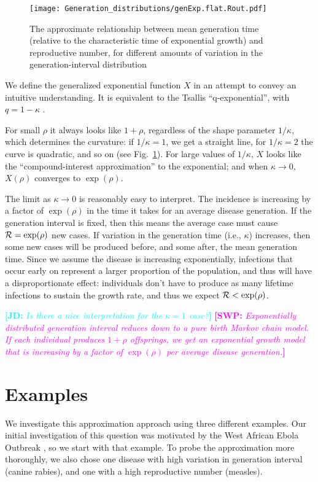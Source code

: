 \documentclass[12pt,]{article}
\newcommand{\RR}{\ensuremath{{\cal R}}}
\newcommand{\fref}[1]{Fig.~\ref{fig:#1}}
\newcommand{\comment}[3]{\textcolor{#1}{\textbf{[#2: }\textit{#3}\textbf{]}}}
\newcommand{\jd}[1]{\comment{cyan}{JD}{#1}}
\newcommand{\swp}[1]{\comment{magenta}{SWP}{#1}}
\begin{document}
\begin{figure}[htbp]
	\centering \texttt{[image: Generation\_distributions/genExp.flat.Rout.pdf]}
	\caption{
		The approximate relationship between mean generation time (relative to
		the characteristic time of exponential growth) and reproductive number,
		for different amounts of variation in the generation-interval
		distribution
	} \label{fig:genExp} 
\end{figure}
We define the generalized exponential function $X$ in an attempt to convey an intuitive understanding.
It is equivalent to the Tsallis ``q-exponential'', with $q=1-\kappa$ \cite{tsallis1994numbers}.

For small $\rho$ it always looks like $1+\rho$, regardless of the shape parameter $1/\kappa$, which determines the curvature: if $1/\kappa = 1$, we get a straight line, for $1/\kappa=2$ the curve is quadratic, and so on (see \fref{genExp}).
For large values of $1/\kappa$, $X$ looks like the ``compound-interest approximation'' to the exponential; and when $\kappa \to 0$, $X(\rho)$ converges to $\exp(\rho)$.

The limit as $\kappa\to 0$ is reasonably easy to interpret. The incidence is increasing by a factor of $\exp(\rho)$ in the time it takes for an average disease generation. If the generation interval is fixed, then this means the average case must cause $\RR = \exp(\rho)$ new cases.
If variation in the generation time (i.e., $\kappa$) increases, then some new cases will be produced before, and some after, the mean generation time.
Since we assume the disease is increasing exponentially, infections that occur early on represent a larger proportion of the population, and thus will have a disproportionate effect: individuals don't have to produce as many lifetime infections to sustain the growth rate, and thus we expect  $\RR < \exp(\rho)$.

\jd{Is there a nice interpretation for the $\kappa=1$ case?}
\swp{Exponentially distributed generation interval reduces down to a pure birth Markov chain model. If each individual produces $1+\rho$ offsprings, we get an exponential growth model that is increasing by a factor of $\exp(\rho)$ per average disease generation.}

\section{Examples}

We investigate this approximation approach using three different examples. Our initial investigation of this question was motivated by the West African Ebola Outbreak \cite{Weitz}, so we start with that example. To probe the approximation more thoroughly, we also chose one disease with high variation in generation interval (canine rabies), and one with a high reproductive number (measles).
\end{document}
